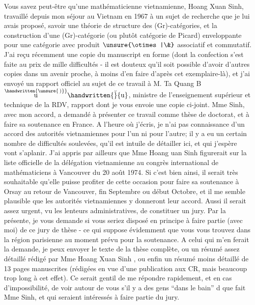 Vous savez peut-être qu'une mathématicienne vietnamienne, Hoang Xuan Sinh,  travaillé depuis mon séjour au Vietnam en 1967 à un sujet de recherche que je lui avais proposé, savoir une théorie de structure des (Gr)-catégories, et la construction d'une (Gr)-catégorie (ou plutôt catégorie de Picard) enveloppante pour une catégorie avec produit $\unsure{\otimes|\&}$ associatif et commutatif. J'ai reçu récemment une copie du manuscript en forme (dont la confection s'est faite au prix de mille difficultés - il est douteux qu'il soit possible d'avoir d'autres copies dans un avenir proche, à moins d'en faire d'après cet exemplaire-là), et j'ai envoyé un rapport officiel au sujet de ce travail à M. Ta Quang B$\overset{\handwritten{\unsure{\,)}}}{\mathrm{u}}\handwritten{\breve}{\mathrm{u}}$, ministre de l'enseignement supérieur et technique de la RDV, rapport dont je vous envoie une copie ci-joint. Mme Sinh, avec mon accord, a demandé à présenter ce travail comme thèse de doctorat, et à faire sa soutenance en France. A l'heure où j'écris, je n'ai pas connaissance d'un accord des autorités vietnamiennes pour l'un ni pour l'autre; il y a eu un certain nombre de difficultés soulevées, qu'il est intuile de détailler ici, et qui j'espère vont s'aplanir. J'ai appris par ailleurs que Mme Hoang uan Sinh figurerait sur la liste officielle de la délégation vietnamienne au congrès international de mathématiciens à Vancouver du 20 août 1974. Si c'est bien ainsi, il serait très souhaitable qu'elle puisse profiter de cette occasion pour faire sa soutenance à Orsay au retour de Vancouver, fin Septembre ou début Octobre, et il me semble plausible que les autorités vietnamiennes y donneront leur accord. Aussi il serait assez urgent, vu les lenteurs administratives, de constituer un jury. Par la présente, je vous demande si vous seriez disposé en principe à faire partie (avec moi) de ce jury de thèse - ce qui suppose évidemment que vous vous trouvez dans la région parisienne au moment prévu pour la soutenance. A celui qui m'en ferait la demande, je peux envoyer le texte de la thèse complète, ou un résumé assez détaillé rédigé par Mme Hoang Xuan Sinh , ou enfin un résumé moins détaillé de 13 pages manuscrites (rédigées en vue d'une publication aux CR, mais beaucoup trop long à cet effet). Ce serait gentil de me répondre rapidement, et en cas d'impossibilité, de voir autour de vous s'il y a des gens ``dans le bain'' d   que fait Mme Sinh, et qui seraient intéressés à faire partie du jury.

